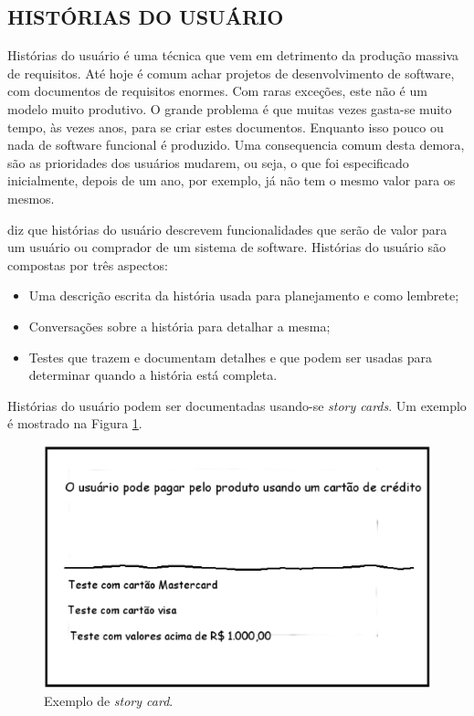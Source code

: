 \subsection{HISTÓRIAS DO USUÁRIO}

Histórias do usuário é uma técnica que vem em detrimento da produção massiva de requisitos. 
Até hoje é comum achar projetos de desenvolvimento de software, com documentos de requisitos enormes. 
Com raras exceções, este não é um modelo muito produtivo. 
O grande problema é que muitas vezes gasta-se muito tempo, às vezes anos, para se criar estes documentos. 
Enquanto isso pouco ou nada de software funcional é produzido. 
Uma consequencia comum desta demora, são as prioridades dos usuários mudarem, ou seja, o que foi especificado inicialmente, depois de um ano, por exemplo, já não tem o mesmo valor para os mesmos.

\cite{cohn2004} diz que histórias do usuário descrevem funcionalidades que serão de valor para um usuário ou comprador de um sistema de software. Histórias do usuário são compostas por três aspectos: 
\begin{itemize}
	\item Uma descrição escrita da história usada para planejamento e como lembrete;
	\item Conversações sobre a história para detalhar a mesma;
	\item Testes que trazem e documentam detalhes e que podem ser usadas para determinar quando a história está completa.
\end{itemize}

Histórias do usuário podem ser documentadas usando-se \emph{story cards}. Um exemplo é mostrado na Figura \ref{story_card}.
\begin{figure}[ht]
	\centering
	\includegraphics[width=15 cm]{figuras/story_card.eps}
	\caption{Exemplo de \emph{story card}.}
    	\label{story_card}
\end{figure}

